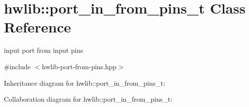 \hypertarget{classhwlib_1_1port__in__from__pins__t}{}\section{hwlib\+:\+:port\+\_\+in\+\_\+from\+\_\+pins\+\_\+t Class Reference}
\label{classhwlib_1_1port__in__from__pins__t}


input port from input pins  




{\ttfamily \#include $<$hwlib-\/port-\/from-\/pins.\+hpp$>$}



Inheritance diagram for hwlib\+:\+:port\+\_\+in\+\_\+from\+\_\+pins\+\_\+t\+:


Collaboration diagram for hwlib\+:\+:port\+\_\+in\+\_\+from\+\_\+pins\+\_\+t\+:
